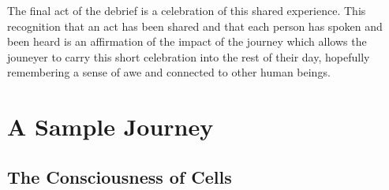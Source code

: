 \documentclass[12pt]{book}
\begin{document}
The final act of the debrief is a celebration of this shared experience.
This recognition that an act has been shared and that each person
has spoken and been heard is an affirmation of the impact of the
journey which allows the jouneyer to carry this short celebration
into the rest of their day, hopefully remembering a sense of awe
and connected to other human beings.


\chapter{A Sample Journey}

\section{The Consciousness of Cells}
\end{document}
